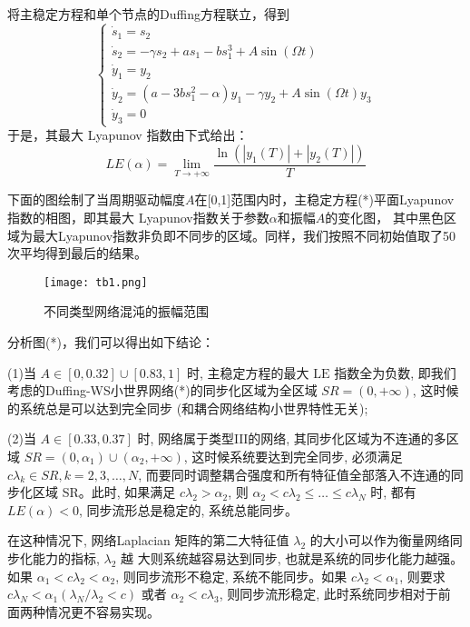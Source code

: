 将主稳定方程和单个节点的Duffing方程联立，得到
\begin{equation}
    \left\{\begin{array}{l}
    \dot{s}_1=s_2 \\
    \dot{s}_2=-\gamma s_2+a s_1-b s_1^3+A \sin (\Omega t) \\
    \dot{y}_1=y_2 \\
    \dot{y}_2=\left(a-3 b s_1^2-\alpha\right) y_1-\gamma y_2+A \sin (\Omega t) y_3 \\
    \dot{y}_3=0
    \end{array}\right.
\end{equation}
于是，其最大 Lyapunov 指数由下式给出：
\begin{equation}
L E(\alpha)=\lim _{T \rightarrow+\infty}
\frac{\ln \left(\left|y_1(T)\right|+\left|y_2(T)\right|\right)}{T}
\end{equation}

下面的图绘制了当周期驱动幅度$A$在[0,1]范围内时，主稳定方程(*)平面Lyapunov指数的相图，即其最大 Lyapunov指数关于参数$\alpha$和振幅$A$的变化图，
其中黑色区域为最大Lyapunov指数非负即不同步的区域。同样，我们按照不同初始值取了50次平均得到最后的结果。\par
\begin{figure}[!htbp]
    \centering
    \texttt{[image: tb1.png]}
    \caption{不同类型网络混沌的振幅范围}
\end{figure}
分析图(*)，我们可以得出如下结论：

(1)当 $A \in[0,0.32] \cup[0.83,1]$ 时, 主稳定方程的最大 $\mathrm{LE}$ 指数全为负数, 即我们考虑的Duffing-WS小世界网络(*)的同步化区域为全区域 $S R=(0,+\infty)$,
这时候的系统总是可以达到完全同步 (和耦合网络结构小世界特性无关);\par

(2)当 $A \in[0.33,0.37]$ 时, 网络属于类型$\mathrm{III}$的网络, 其同步化区域为不连通的多区域 $S R=\left(0, \alpha_1\right) \cup\left(\alpha_2,+\infty\right)$,
这时候系统要达到完全同步, 必须满足 $c \lambda_k \in S R, k=2,3, \ldots, N$,
而要同时调整耦合强度和所有特征值全部落入不连通的同步化区域 SR。此时,
如果满足 $c \lambda_2>\alpha_2$, 则 $\alpha_2<c \lambda_2 \leq \ldots \leq c \lambda_N$ 时,
都有 $L E(\alpha)<0$, 同步流形总是稳定的, 系统总能同步。

在这种情况下, 网络Laplacian 矩阵的第二大特征值
$\lambda_2$ 的大小可以作为衡量网络同步化能力的指标, $\lambda_2$ 越 大则系统越容易达到同步, 也就是系统的同步化能力越强。
如果 $\alpha_1<c \lambda_2<\alpha_2$, 则同步流形不稳定, 系统不能同步。如果 $c \lambda_2<\alpha_1$,
则要求 $c \lambda_N<\alpha_1\left(\lambda_N / \lambda_2<c\right)$ 或者 $\alpha_2<c \lambda_3$, 则同步流形稳定,
此时系统同步相对于前 面两种情况更不容易实现。

